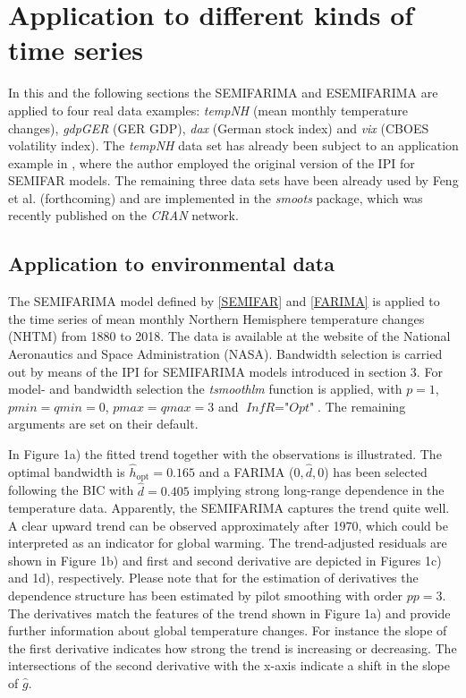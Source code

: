 \documentclass[12pt]{article}
\begin{document}
\section{Application to different kinds of time series}
In this and the following sections the SEMIFARIMA and ESEMIFARIMA are applied to four real data examples: \textit{tempNH} (mean monthly temperature changes), \textit{gdpGER} (GER GDP), \textit{dax} (German stock index) and \textit{vix} (CBOES volatility index). The \textit{tempNH} data set has already been subject to an application example in \citet{feng2007asymptotic}, where the author employed the original version of the IPI for SEMIFAR models. The remaining three data sets have been already used by Feng et al. (forthcoming) and are implemented in the \textit{smoots} package, which was recently published on the \textit{CRAN} network. 

\subsection{Application to environmental data}
The SEMIFARIMA model defined by \eqref{SEMIFAR} and \eqref{FARIMA} is applied to the time series of mean monthly Northern Hemisphere temperature changes (NHTM) from 1880 to 2018. The data is available at the website of the National Aeronautics and Space Administration (NASA). Bandwidth selection is carried out by means of the IPI for SEMIFARIMA models introduced in section 3. For model- and bandwidth selection the \textit{tsmoothlm} function is applied, with $\textit{p} = 1$, $\textit{pmin} = \textit{qmin} = 0$, $\textit{pmax} = \textit{qmax} = 3$ and $\textit{InfR} = \textit{"Opt"}$. The remaining arguments are set on their default. 

In Figure 1a) the fitted trend together with the observations is illustrated. The optimal bandwidth is $\hat{h}_{\text{opt}} = 0.165$ and a FARIMA ($0, \hat{d}, 0$) has been selected following the BIC with $\hat{d} = 0.405$ implying strong long-range dependence in the temperature data. Apparently, the SEMIFARIMA captures the trend quite well. A clear upward trend can be observed approximately after 1970, which could be interpreted as an indicator for global warming. The trend-adjusted residuals are shown in Figure 1b) and first and second derivative are depicted in Figures 1c) and 1d), respectively. Please note that for the estimation of derivatives the dependence structure has been estimated by pilot smoothing with order $\textit{pp} = 3$. The derivatives match the features of the trend shown in Figure 1a) and provide further information about global temperature changes. For instance the slope of the first derivative indicates how strong the trend is increasing or decreasing. The intersections of the second derivative with the x-axis indicate a shift in the slope of $\hat{g}$. 
 
\end{document}
